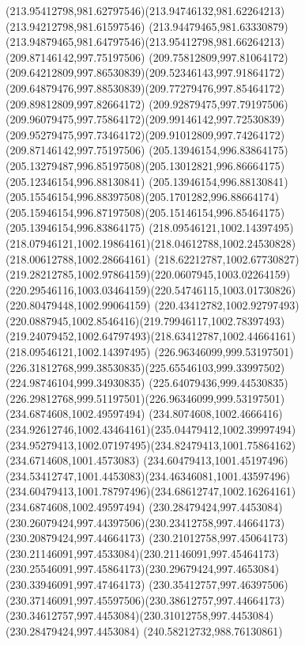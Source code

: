 {    \curveto(213.95412798,981.62797546)(213.94746132,981.62264213)(213.94212798,981.61597546)
    \curveto(213.94479465,981.63330879)(213.94879465,981.64797546)(213.95412798,981.66264213)
    \moveto(209.87146142,997.75197506)
    \curveto(209.75812809,997.81064172)(209.64212809,997.86530839)(209.52346143,997.91864172)
    \curveto(209.64879476,997.88530839)(209.77279476,997.85464172)(209.89812809,997.82664172)
    \curveto(209.92879475,997.79197506)(209.96079475,997.75864172)(209.99146142,997.72530839)
    \curveto(209.95279475,997.73464172)(209.91012809,997.74264172)(209.87146142,997.75197506)
    \moveto(205.13946154,996.83864175)
    \curveto(205.13279487,996.85197508)(205.13012821,996.86664175)(205.12346154,996.88130841)
    \curveto(205.13946154,996.88130841)(205.15546154,996.88397508)(205.1701282,996.88664174)
    \curveto(205.15946154,996.87197508)(205.15146154,996.85464175)(205.13946154,996.83864175)
    \moveto(218.09546121,1002.14397495)
    \curveto(218.07946121,1002.19864161)(218.04612788,1002.24530828)(218.00612788,1002.28664161)
    \curveto(218.62212787,1002.67730827)(219.28212785,1002.97864159)(220.0607945,1003.02264159)
    \curveto(220.29546116,1003.03464159)(220.54746115,1003.01730826)(220.80479448,1002.99064159)
    \curveto(220.43412782,1002.92797493)(220.0887945,1002.8546416)(219.79946117,1002.78397493)
    \curveto(219.24079452,1002.64797493)(218.63412787,1002.44664161)(218.09546121,1002.14397495)
    \moveto(226.96346099,999.53197501)
    \curveto(226.31812768,999.38530835)(225.65546103,999.33997502)(224.98746104,999.34930835)
    \curveto(225.64079436,999.44530835)(226.29812768,999.51197501)(226.96346099,999.53197501)
    \moveto(234.6874608,1002.49597494)
    \curveto(234.8074608,1002.4666416)(234.92612746,1002.43464161)(235.04479412,1002.39997494)
    \curveto(234.95279413,1002.07197495)(234.82479413,1001.75864162)(234.6714608,1001.4573083)
    \curveto(234.60479413,1001.45197496)(234.53412747,1001.4453083)(234.46346081,1001.43597496)
    \curveto(234.60479413,1001.78797496)(234.68612747,1002.16264161)(234.6874608,1002.49597494)
    \moveto(230.28479424,997.4453084)
    \curveto(230.26079424,997.44397506)(230.23412758,997.44664173)(230.20879424,997.44664173)
    \curveto(230.21012758,997.45064173)(230.21146091,997.4533084)(230.21146091,997.45464173)
    \curveto(230.25546091,997.45864173)(230.29679424,997.4653084)(230.33946091,997.47464173)
    \curveto(230.35412757,997.46397506)(230.37146091,997.45597506)(230.38612757,997.44664173)
    \curveto(230.34612757,997.4453084)(230.31012758,997.4453084)(230.28479424,997.4453084)
    \moveto(240.58212732,988.76130861)
}
